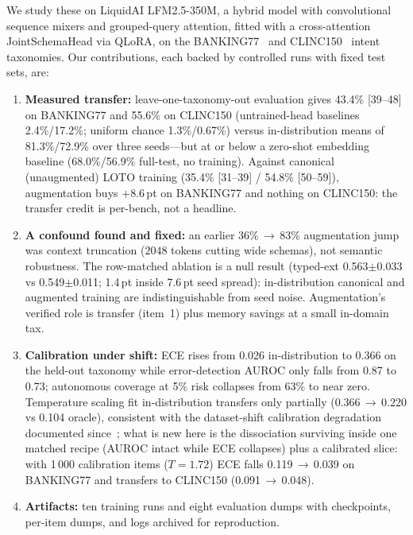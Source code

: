 We study these on LiquidAI LFM2.5-350M, a hybrid model with convolutional
 sequence mixers and grouped-query attention, fitted with a cross-attention
 JointSchemaHead via QLoRA, on the BANKING77~\cite{casanueva2020banking77} and
 CLINC150~\cite{larson2019clinc150} intent taxonomies. Our contributions, each backed by controlled runs
 with fixed test sets, are:
 \begin{enumerate}
 \item \textbf{Measured transfer:} leave-one-taxonomy-out evaluation gives 43.4\%
   [39--48] on BANKING77 and 55.6\% on CLINC150 (untrained-head baselines 2.4\%/17.2\%;
   uniform chance 1.3\%/0.67\%) versus
   in-distribution means of 81.3\%/72.9\% over three seeds---but at or below a
   zero-shot embedding baseline (68.0\%/56.9\% full-test, no training).
   Against canonical (unaugmented) LOTO training (35.4\% [31--39] / 54.8\%
   [50--59]), augmentation buys $+$8.6\,pt on BANKING77 and nothing on CLINC150:
   the transfer credit is per-bench, not a headline.
 \item \textbf{A confound found and fixed:} an earlier 36\%\,$\to$\,83\%
   augmentation jump was context truncation ($2048$ tokens cutting wide
   schemas), not semantic robustness. The row-matched ablation is a null
   result (typed-ext 0.563$\pm$0.033 vs 0.549$\pm$0.011; 1.4\,pt inside
   7.6\,pt seed spread): in-distribution canonical and augmented training are
   indistinguishable from seed noise. Augmentation's verified role is transfer
   (item~1) plus memory savings at a small in-domain tax.
 \item \textbf{Calibration under shift:} ECE rises from 0.026 in-distribution to
   0.366 on the held-out taxonomy while error-detection AUROC only falls from
   0.87 to 0.73; autonomous coverage at 5\% risk collapses from 63\% to near
   zero. Temperature scaling fit in-distribution transfers only partially
   (0.366\,$\to$\,0.220 vs 0.104 oracle), consistent with the dataset-shift
   calibration degradation documented since~\cite{ovadia2019trust}; what is new
   here is the dissociation surviving inside one matched recipe (AUROC intact
   while ECE collapses) plus a calibrated slice: with 1\,000 calibration items
   ($T{=}1.72$) ECE falls 0.119\,$\to$\,0.039 on BANKING77 and transfers to
   CLINC150 (0.091\,$\to$\,0.048).
 \item \textbf{Artifacts:} ten training runs and eight evaluation dumps with
   checkpoints, per-item dumps, and logs archived for reproduction.
 \end{enumerate}
